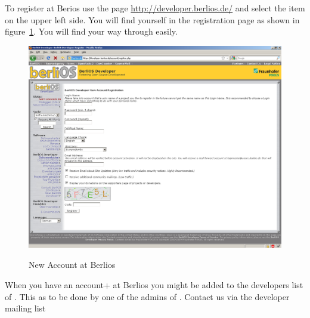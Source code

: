 To register at Berios use the page \url{http://developer.berlios.de/}
and select the item  on the upper left side. You
will find yourself in the registration page as shown in
figure~\ref{fig:berlios-register}. You will find your way through
easily.
\begin{figure}[htbp]
  \centering  \includegraphics[scale=.33]{image/berlios-register}
  \caption{New Account at Berlios}\label{fig:berlios-register}
\end{figure}

When you have an \+account+ at Berlios you might be added to the
developers list of \ExTeX. This as to be done by one of the admins of
\ExTeX. Contact us via the developer mailing list 

